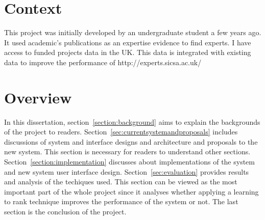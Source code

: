 \section{Context}
This project was initially developed by an undergraduate student a few years ago. It used academic's publications as an expertise evidence to find experts.
I have access to funded projects data in the UK. This data is integrated with existing data to improve the performance of http://experts.sicsa.ac.uk/ ~\cite{sicsasearch}

\section{Overview}
In this dissertation, section~\ref{section:background} aims to explain the backgrounds of the project to readers. 
Section~\ref{sec:currentsystemandproposals} includes discussions of system and interface designs and architecture and proposals to the new system.
This section is necessary for readers to understand other sections. 
Section~\ref{section:implementation} discusses about implementations of the system and new system user interface design. 
Section~\ref{sec:evaluation} provides results and analysis of the techiques used. 
This section can be viewed as the most important part of the whole project since it 
analyses whether applying a learning to rank technique improves the performance of the system or not. 
The last section is the conclusion of the project.

